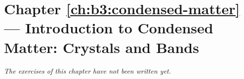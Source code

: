 \section*{Chapter \ref{ch:b3:condensed-matter} --- Introduction to Condensed Matter: Crystals and Bands}


\emph{The exercises of this chapter have not been written yet.}
